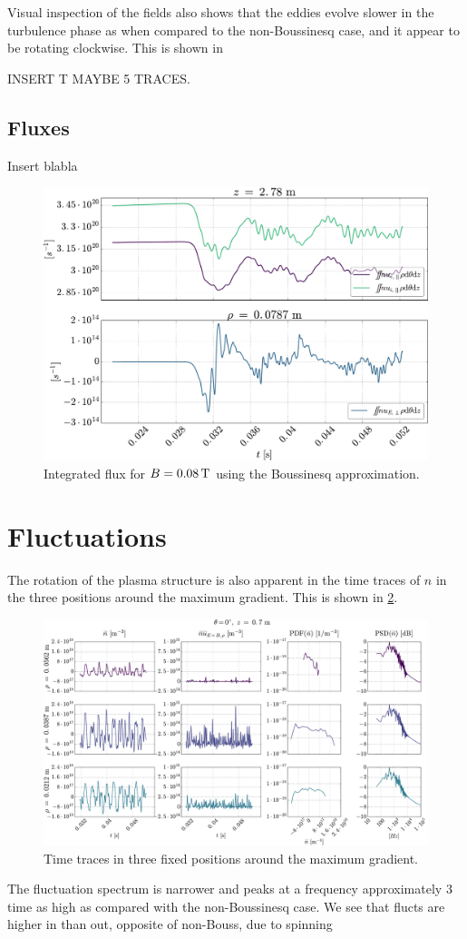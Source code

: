 Visual inspection of the fields also shows that the eddies evolve slower in the turbulence phase as when compared to the non-Boussinesq case, and it appear to be rotating clockwise.
This is shown in

INSERT T MAYBE 5 TRACES.

\subsection{Fluxes}
Insert blabla
%
\begin{figure}[htb]
    \centering
    \includegraphics{fig/results/compareBouss/flux0008B}
    \caption{Integrated flux for $B=0.08\, \text{T}$ using the Boussinesq approximation.}
    \label{fig:fluxB0008}
\end{figure}
%

\section{Fluctuations}
%
The rotation of the plasma structure is also apparent in the time traces of $n$ in the three positions around the maximum gradient.
This is shown in \cref{fig:comb008B}.
%
\begin{figure}[htb]
    \centering
    \includegraphics[width=1.0\textwidth]{fig/results/compareBouss/comb008B}
    \caption{Time traces in three fixed positions around the maximum gradient.}
    \label{fig:comb008B}
\end{figure}
%
The fluctuation spectrum is narrower and peaks at a frequency approximately $3$ time as high as compared with the non-Boussinesq case.
We see that flucts are higher in than out, opposite of non-Bouss, due to spinning

